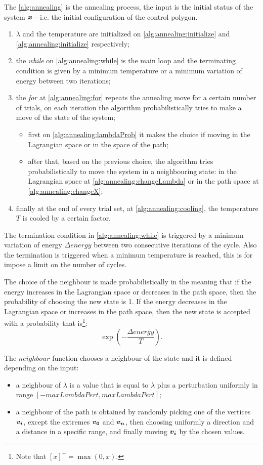 \documentclass[dissertation.tex]{subfiles}
\begin{document}
The \cref{alg:annealing} is the annealing process, the input is the
initial status of the system $\boldsymbol{x}$ - i.e. the initial configuration
of the control polygon.
\begin{enumerate}
\item $\lambda$ and the
  temperature are initialized on
  \cref{alg:annealing:initialize} and \cref{alg:annealing:initialize}
  respectively;
\item the \emph{while} on
  \cref{alg:annealing:while} is the main loop and the terminating
  condition is given by a minimum temperature or a minimum variation of
  energy between two iterations;
\item the \emph{for} at
  \cref{alg:annealing:for} repeats the annealing move for a certain
  number of trials, on each iteration the algorithm probabilistically
  tries to make a move of the state of the system;
  \begin{itemize}
  \item first on
    \cref{alg:annealing:lambdaProb} it makes the choice if moving in the
    Lagrangian space or in the space of the path;
  \item after that, based on the previous
    choice, the algorithm tries probabilistically to move the system
    in a neighbouring
    state: in the
    Lagrangian space at
    \cref{alg:annealing:changeLambda} or in the path space at
    \cref{alg:annealing:changeX};
  \end{itemize}
\item finally at the end of every trial set,
  at \cref{alg:annealing:cooling}, the temperature $T$ is cooled by
  a certain factor.
\end{enumerate}

The termination condition in \cref{alg:annealing:while} is triggered by a
minimum variation of energy $\Delta energy$ between two consecutive
iterations of the cycle. Also the termination is triggered when a
minimum temperature is reached, this is for impose a limit on the
number of cycles.

The choice of the neighbour is made
probabilistically in the meaning that if the energy increases in the
Lagrangian space or decreases in the path space, then the probability of
choosing the new state is 1. If the energy decreases in the Lagrangian
space or increases in the path space, then the new state is accepted
with a probability that is\footnote{Note that $[x]^+=\max(0,x)$.}:
$$\exp(-\frac{\Delta energy}{T}).$$

The $neighbour$ function chooses a neighbour of the state and it is
defined depending on the input:
\begin{itemize}
  \item a neighbour of $\lambda$ is a value that is equal to $\lambda$
    plus a perturbation uniformly in range $[-maxLambdaPert, maxLambdaPert]$;
  \item a neighbour of the path is obtained by randomly picking one of
    the vertices $\boldsymbol{v_i}$, except the extremes $\boldsymbol{v_0}$ and $\boldsymbol{v_n}$,
    then choosing uniformly a direction and a distance
    in a specific range, and finally moving $\boldsymbol{v_i}$ by
    the chosen values.
\end{itemize}
\end{document}

